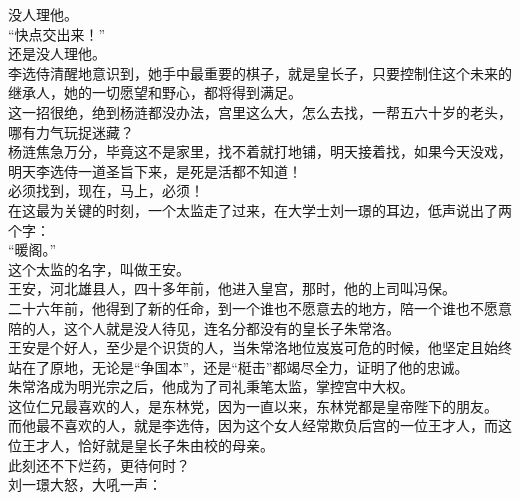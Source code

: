\begin{multicols}{\theparacolNo}
没人理他。\\

“快点交出来！”\\

还是没人理他。\\

李选侍清醒地意识到，她手中最重要的棋子，就是皇长子，只要控制住这个未来的继承人，她的一切愿望和野心，都将得到满足。\\

这一招很绝，绝到杨涟都没办法，宫里这么大，怎么去找，一帮五六十岁的老头，哪有力气玩捉迷藏？\\

杨涟焦急万分，毕竟这不是家里，找不着就打地铺，明天接着找，如果今天没戏，明天李选侍一道圣旨下来，是死是活都不知道！\\

必须找到，现在，马上，必须！\\

在这最为关键的时刻，一个太监走了过来，在大学士刘一璟的耳边，低声说出了两个字：\\

“暖阁。”\\

这个太监的名字，叫做王安。\\

王安，河北雄县人，四十多年前，他进入皇宫，那时，他的上司叫冯保。\\

二十六年前，他得到了新的任命，到一个谁也不愿意去的地方，陪一个谁也不愿意陪的人，这个人就是没人待见，连名分都没有的皇长子朱常洛。\\

王安是个好人，至少是个识货的人，当朱常洛地位岌岌可危的时候，他坚定且始终站在了原地，无论是“争国本”，还是“梃击”都竭尽全力，证明了他的忠诚。\\

朱常洛成为明光宗之后，他成为了司礼秉笔太监，掌控宫中大权。\\

这位仁兄最喜欢的人，是东林党，因为一直以来，东林党都是皇帝陛下的朋友。\\

而他最不喜欢的人，就是李选侍，因为这个女人经常欺负后宫的一位王才人，而这位王才人，恰好就是皇长子朱由校的母亲。\\

此刻还不下烂药，更待何时？\\

刘一璟大怒，大吼一声：\\


\end{multicols}
